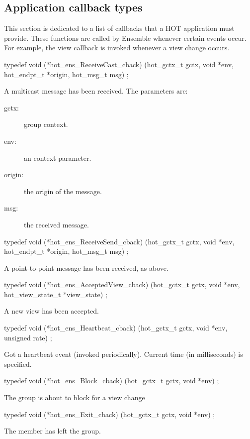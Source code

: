 \subsection{Application callback types}

This section is dedicated to a list of callbacks that a HOT
application must provide. These functions are called by Ensemble
whenever certain events occur. For example, the view callback is
invoked whenever a view change occurs.

\begin{codebox}
typedef void (*hot_ens_ReceiveCast_cback)
    (hot_gctx_t gctx, void *env, hot_endpt_t *origin, hot_msg_t msg) ;
\end{codebox}
A multicast message has been received. The parameters are: 
\begin{description}
\item[gctx:] group context.
\item[env:] an context parameter.
\item[origin:] the origin of the message.
\item[msg:] the received message.
\end{description}

\begin{codebox}
typedef void (*hot_ens_ReceiveSend_cback)
    (hot_gctx_t gctx, void *env, hot_endpt_t *origin, hot_msg_t msg) ;
\end{codebox}
A point-to-point message has been received, as above. 

\begin{codebox}
typedef void (*hot_ens_AcceptedView_cback)
    (hot_gctx_t gctx, void *env, hot_view_state_t *view_state) ;
\end{codebox}
A new view has been accepted. 

\begin{codebox}
typedef void (*hot_ens_Heartbeat_cback)
    (hot_gctx_t gctx, void *env, unsigned rate) ;
\end{codebox}
Got a heartbeat event (invoked periodically).  Current time (in
milliseconds) is specified.

\begin{codebox}
typedef void (*hot_ens_Block_cback)
  (hot_gctx_t gctx, void *env) ;
\end{codebox}
The group is about to block for a view change 

\begin{codebox}
typedef void (*hot_ens_Exit_cback)
  (hot_gctx_t gctx, void *env) ;
\end{codebox}
The member has left the group.

